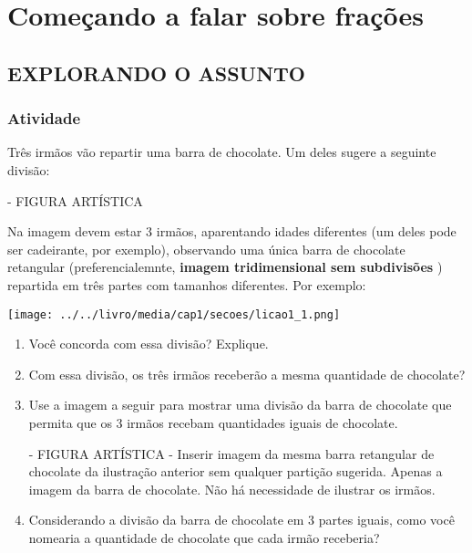 \documentclass[a4,12pt]{book}
\begin{document}
\chapter{Começando a falar sobre frações }

\section{EXPLORANDO O ASSUNTO }

\subsection{Atividade}

Três irmãos vão repartir uma barra de chocolate. Um deles sugere a seguinte divisão: 

\begin{imagem*}[breakable]{}{}   - FIGURA ARTÍSTICA   
  
Na imagem devem estar 3 irmãos, aparentando idades diferentes (um deles pode ser cadeirante, por exemplo), observando uma única barra de chocolate retangular (preferencialemnte,   {\bf imagem tridimensional sem subdivisões}  ) repartida em três partes com tamanhos diferentes. Por exemplo:  
  
    \texttt{[image: ../../livro/media/cap1/secoes/licao1\_1.png]}  
  
\end{imagem*}

\begin{enumerate} [\quad a)] %
  \item     Você concorda com essa divisão? Explique.
  \item     Com essa divisão, os três irmãos receberão a mesma quantidade de chocolate?
  \item     Use a imagem a seguir para mostrar uma divisão da barra de chocolate que permita que os 3 irmãos recebam quantidades iguais de chocolate. 
\begin{imagem*}[breakable]{}{}    - FIGURA ARTÍSTICA - Inserir imagem da mesma barra retangular de chocolate da ilustração anterior sem qualquer partição sugerida. Apenas a imagem da barra de chocolate. Não há necessidade de ilustrar os irmãos.\end{imagem*}
  \item     Considerando a divisão da barra de chocolate em 3 partes iguais, como você nomearia a quantidade de chocolate que cada irmão receberia? 
\end{enumerate} %
\end{document}
